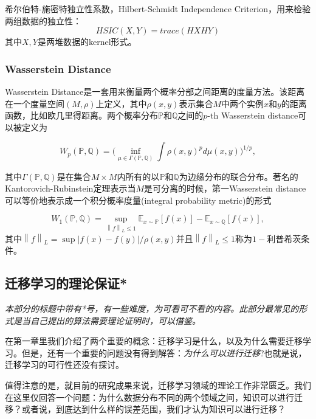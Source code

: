 希尔伯特-施密特独立性系数，Hilbert-Schmidt Independence Criterion，用来检验两组数据的独立性：
\begin{equation}
	HSIC(X,Y) = trace(HXHY)
\end{equation}
其中$X,Y$是两堆数据的kernel形式。

\subsubsection{Wasserstein Distance}

Wasserstein Distance是一套用来衡量两个概率分部之间距离的度量方法。该距离在一个度量空间$(M,\rho)$上定义，其中$\rho(x,y)$表示集合$M$中两个实例$x$和$y$的距离函数，比如欧几里得距离。两个概率分布$\mathbb{P}$和$\mathbb{Q}$之间的$p{\text{-th}}$ Wasserstein distance可以被定义为

\begin{equation}
W_p(\mathbb{P}, \mathbb{Q}) = \Big(\inf_{\mu \in \Gamma(\mathbb{P}, \mathbb{Q}) } \int \rho(x,y)^p d\mu(x,y) \Big)^{1/p},
\end{equation}

其中$\Gamma(\mathbb{P}, \mathbb{Q})$是在集合$M\times M$内所有的以$\mathbb{P}$和$\mathbb{Q}$为边缘分布的联合分布。著名的Kantorovich-Rubinstein定理表示当$M$是可分离的时候，第一Wasserstein distance可以等价地表示成一个积分概率度量(integral probability metric)的形式

\begin{equation}
W_1(\mathbb{P},\mathbb{Q})= \sup_{\left \| f \right \|_L \leq 1} \mathbb{E}_{x \sim \mathbb{P}}[f(x)] - \mathbb{E}_{x \sim \mathbb{Q}}[f(x)],
\end{equation}
其中$\left \| f \right \|_L = \sup{|f(x) - f(y)|} / \rho(x,y)$并且$\left \| f \right \|_L \leq 1$称为$1-$利普希茨条件。

\subsection{迁移学习的理论保证*}
\textit{
本部分的标题中带有*号，有一些难度，为可看可不看的内容。此部分最常见的形式是当自己提出的算法需要理论证明时，可以借鉴。}

在第一章里我们介绍了两个重要的概念：迁移学习是什么，以及为什么需要迁移学习。但是，还有一个重要的问题没有得到解答：\textit{为什么可以进行迁移}?也就是说，迁移学习的可行性还没有探讨。

值得注意的是，就目前的研究成果来说，迁移学习领域的理论工作非常匮乏。我们在这里仅回答一个问题：为什么数据分布不同的两个领域之间，知识可以进行迁移？或者说，到底达到什么样的误差范围，我们才认为知识可以进行迁移？

